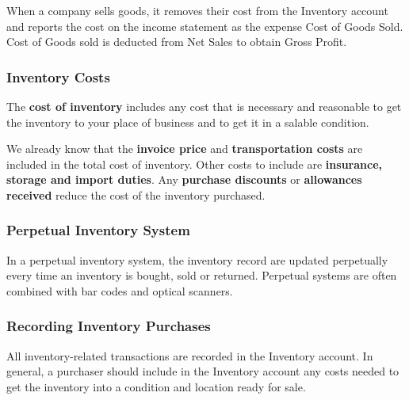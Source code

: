 \documentclass[../main.tex]{subfiles}
\begin{document}
	When a company sells goods, it removes their cost from the Inventory 
	account and reports the cost on the income statement as the expense Cost of 
	Goods Sold. Cost of Goods sold is deducted from Net Sales to obtain Gross 
	Profit.
	
	\subsubsection{Inventory Costs}
	
	The \textbf{cost of inventory} includes any cost that is necessary and 
	reasonable to get the inventory to your place of business and to get it in 
	a salable condition.
	
	We already know that the \textbf{invoice price} and \textbf{transportation 
	costs} are included in the total cost of inventory. Other costs to include 
	are \textbf{insurance, storage and import duties}. Any \textbf{purchase 
	discounts} 
	or \textbf{allowances received} reduce the cost of the inventory purchased.
	
	\subsubsection{Perpetual Inventory System}
	
	In a perpetual inventory system, the inventory record are updated 
	perpetually \ie every time an inventory is bought, sold or returned. 
	Perpetual systems are often combined with bar codes and optical scanners. 
	
	\subsubsection{Recording Inventory Purchases}
	
	All inventory-related transactions are recorded in the Inventory account. 
	In general, a purchaser should include in the Inventory account any costs 
	needed to get the inventory into a condition and location ready for sale.
	
\end{document}
